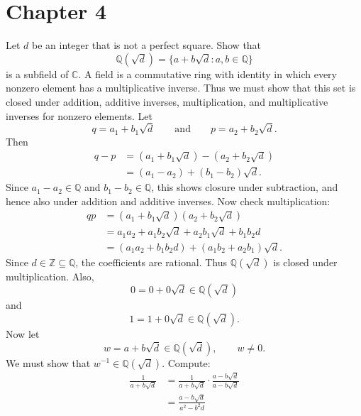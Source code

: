 
\section{Chapter 4}

\begin{problem}{
    Let $d$ be an integer that is not a perfect square.
    Show that
    \[
        \mathbb{Q}\left(\sqrt{d}\right)=\{a+b\sqrt{d}:a,b\in\mathbb{Q}\}
    \]
    is a subfield of $\mathbb{C}$.
}
    A field is a commutative ring with identity in which every nonzero element has a multiplicative inverse.
    Thus we must show that this set is closed under addition, additive inverses, multiplication, and multiplicative inverses for nonzero elements.
    Let
    \[
        q=a_1+b_1\sqrt{d}
        \qquad\text{and}\qquad
        p=a_2+b_2\sqrt{d}.
    \]
    Then
    \begin{align*}
        q-p
        &=
        (a_1+b_1\sqrt{d})-(a_2+b_2\sqrt{d})\\
        &=
        (a_1-a_2)+(b_1-b_2)\sqrt{d}.
    \end{align*}
    Since $a_1-a_2\in\mathbb{Q}$ and $b_1-b_2\in\mathbb{Q}$, this shows closure under subtraction, and hence also under addition and additive inverses.
    Now check multiplication:
    \begin{align*}
        qp
        &=
        (a_1+b_1\sqrt{d})(a_2+b_2\sqrt{d})\\
        &=
        a_{1}a_2+a_{1}b_2\sqrt{d}+a_{2}b_1\sqrt{d}+b_{1}b_{2}d\\
        &=
        (a_{1}a_2+b_{1}b_{2}d)+(a_{1}b_2+a_{2}b_1)\sqrt{d}.
    \end{align*}
    Since $d\in\mathbb{Z}\subseteq\mathbb{Q}$, the coefficients are rational.
    Thus $\mathbb{Q}\left(\sqrt{d}\right)$ is closed under multiplication.
    Also,
    \[
        0=0+0\sqrt{d}\in\mathbb{Q}\left(\sqrt{d}\right)
    \]
    and
    \[
        1=1+0\sqrt{d}\in\mathbb{Q}\left(\sqrt{d}\right).
    \]
    Now let
    \[
        w=a+b\sqrt{d}\in\mathbb{Q}\left(\sqrt{d}\right),
        \qquad
        w\neq 0.
    \]
    We must show that $w^{-1}\in\mathbb{Q}\left(\sqrt{d}\right)$.
    Compute:
    \begin{align*}
        \frac{1}{a+b\sqrt{d}}
        &=
        \frac{1}{a+b\sqrt{d}}\cdot \frac{a-b\sqrt{d}}{a-b\sqrt{d}}\\
        &=
        \frac{a-b\sqrt{d}}{a^2-b^{2}d}\\

\end{align*}
\end{problem}
